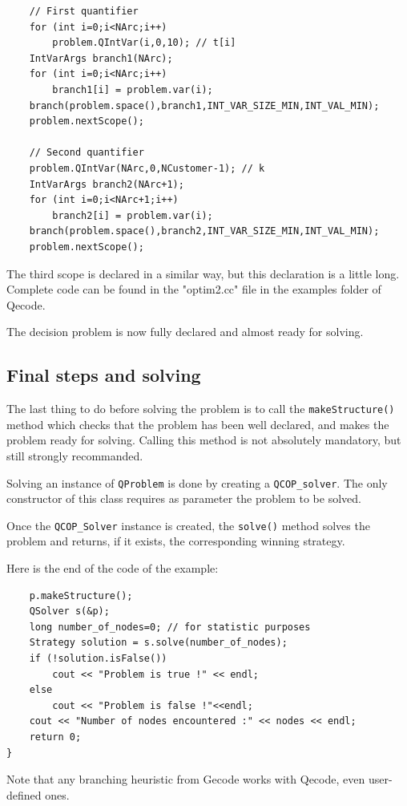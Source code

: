 \documentclass{article}
\begin{document}
{\small
\begin{verbatim}
    // First quantifier
    for (int i=0;i<NArc;i++)
        problem.QIntVar(i,0,10); // t[i]
    IntVarArgs branch1(NArc);
    for (int i=0;i<NArc;i++) 
        branch1[i] = problem.var(i);
    branch(problem.space(),branch1,INT_VAR_SIZE_MIN,INT_VAL_MIN);
    problem.nextScope();

    // Second quantifier    
    problem.QIntVar(NArc,0,NCustomer-1); // k
    IntVarArgs branch2(NArc+1);
    for (int i=0;i<NArc+1;i++) 
        branch2[i] = problem.var(i);
    branch(problem.space(),branch2,INT_VAR_SIZE_MIN,INT_VAL_MIN);
    problem.nextScope();
\end{verbatim}
}

The third scope is declared in a similar way, but this declaration is a little long. Complete code can be found in the "optim2.cc" file in the examples folder of Qecode.

The decision problem is now fully declared and almost ready for solving.


\subsection{Final steps and solving}
The last thing to do before solving the problem is to call the {\tt makeStructure()} method which checks that the problem has been well declared, and makes the problem ready for solving. Calling this method is not absolutely mandatory, but still strongly recommanded.

 Solving an instance of {\tt QProblem} is done by creating a {\tt QCOP\_solver}. The only constructor of this class requires as parameter the problem to be solved.

Once the {\tt QCOP\_Solver} instance is created, the {\tt solve()} method solves the problem and returns, if it exists, the corresponding winning strategy.

\noindent Here is the end of the code of the example: 
{\small
\begin{verbatim}
    p.makeStructure();
    QSolver s(&p);
    long number_of_nodes=0; // for statistic purposes
    Strategy solution = s.solve(number_of_nodes);
    if (!solution.isFalse())
        cout << "Problem is true !" << endl;
    else
        cout << "Problem is false !"<<endl;
    cout << "Number of nodes encountered :" << nodes << endl;
    return 0;
}
\end{verbatim}
}

\noindent Note that any branching heuristic from Gecode works with Qecode, even user-defined ones. 
\end{document}
